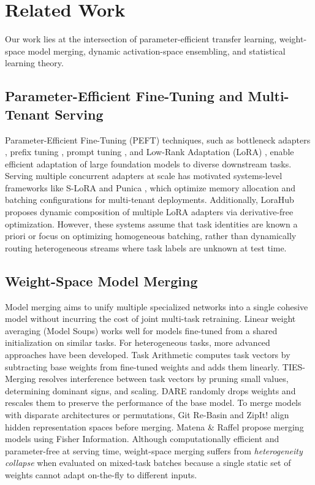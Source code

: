 \section{Related Work}
\label{sec:related_work}

Our work lies at the intersection of parameter-efficient transfer learning, weight-space model merging, dynamic activation-space ensembling, and statistical learning theory. 

\subsection{Parameter-Efficient Fine-Tuning and Multi-Tenant Serving}
Parameter-Efficient Fine-Tuning (PEFT) techniques, such as bottleneck adapters \cite{houlsby2019parameter}, prefix tuning \cite{li2021prefix}, prompt tuning \cite{lester2021power}, and Low-Rank Adaptation (LoRA) \cite{hu2021lora}, enable efficient adaptation of large foundation models to diverse downstream tasks. Serving multiple concurrent adapters at scale has motivated systems-level frameworks like S-LoRA \cite{sheng2023slora} and Punica \cite{chen2023punica}, which optimize memory allocation and batching configurations for multi-tenant deployments. Additionally, LoraHub \cite{huang2024lorahub} proposes dynamic composition of multiple LoRA adapters via derivative-free optimization. However, these systems assume that task identities are known a priori or focus on optimizing homogeneous batching, rather than dynamically routing heterogeneous streams where task labels are unknown at test time.

\subsection{Weight-Space Model Merging}
Model merging aims to unify multiple specialized networks into a single cohesive model without incurring the cost of joint multi-task retraining. Linear weight averaging (Model Soups) \cite{wortsman2022model} works well for models fine-tuned from a shared initialization on similar tasks. For heterogeneous tasks, more advanced approaches have been developed. Task Arithmetic \cite{ilharco2022editing} computes task vectors by subtracting base weights from fine-tuned weights and adds them linearly. TIES-Merging \cite{yadav2023ties} resolves interference between task vectors by pruning small values, determining dominant signs, and scaling. DARE \cite{yu2023dare} randomly drops weights and rescales them to preserve the performance of the base model. To merge models with disparate architectures or permutations, Git Re-Basin \cite{ainsworth2022git} and ZipIt! \cite{stoica2023zipit} align hidden representation spaces before merging. Matena \& Raffel \cite{matena2021merging} propose merging models using Fisher Information. Although computationally efficient and parameter-free at serving time, weight-space merging suffers from \textit{heterogeneity collapse} when evaluated on mixed-task batches because a single static set of weights cannot adapt on-the-fly to different inputs.

